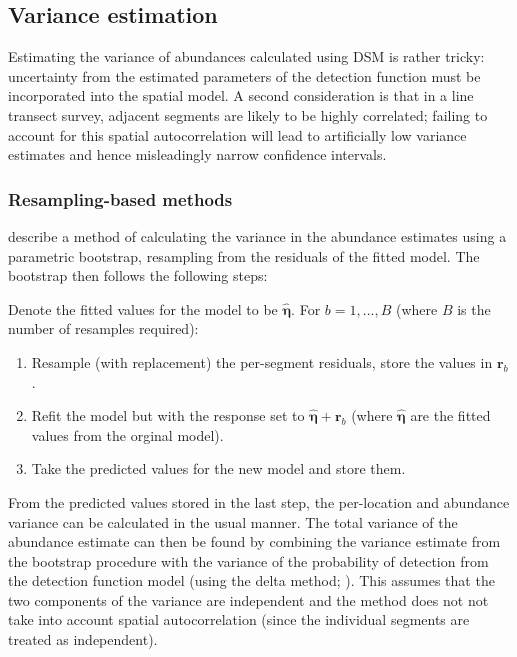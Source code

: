\documentclass[a4paper,12pt]{article}
\begin{document}
\subsection*{Variance estimation}

Estimating the variance of abundances calculated using DSM is rather tricky: uncertainty from the estimated parameters of the detection function must be incorporated into the spatial model. A second consideration is that in a line transect survey, adjacent segments are likely to be highly correlated; failing to account for this spatial autocorrelation will lead to artificially low variance estimates and hence misleadingly narrow confidence intervals.

\subsubsection*{Resampling-based methods}

\cite{Hedley:2004et} describe a method of calculating the variance in the abundance estimates using a parametric bootstrap, resampling from the residuals of the fitted model. The bootstrap then follows the following steps:

Denote the fitted values for the model to be $\hat{\bm{\eta}}$. For $b=1,\ldots,B$ (where $B$ is the number of resamples required):
\begin{enumerate}
	\item Resample (with replacement) the per-segment residuals, store the values in $\mathbf{r}_{b}$.
	\item Refit the model but with the response set to $\hat{\bm{\eta}}+\mathbf{r}_{b}$ (where $\hat{\bm{\eta}}$ are the fitted values from the orginal model).
	\item Take the predicted values for the new model and store them.
\end{enumerate}
From the predicted values stored in the last step, the per-location and abundance variance can be calculated in the usual manner. The total variance of the abundance estimate can then be found by combining the variance estimate from the bootstrap procedure with the variance of the probability of detection from the detection function model (using the delta method; \cite{Seber:2002ti}). This assumes that the two components of the variance are independent and the method does not not take into account spatial autocorrelation (since the individual segments are treated as independent).
\end{document}
